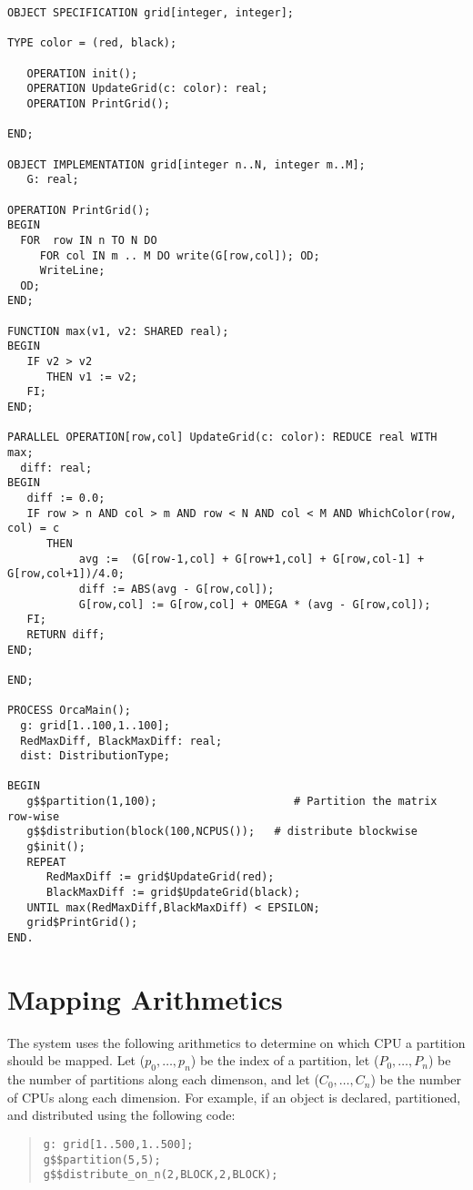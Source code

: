 \documentclass{article}
\begin{document}
\begin{verbatim}
OBJECT SPECIFICATION grid[integer, integer];

TYPE color = (red, black);

   OPERATION init(); 
   OPERATION UpdateGrid(c: color): real; 
   OPERATION PrintGrid();

END; 

OBJECT IMPLEMENTATION grid[integer n..N, integer m..M]; 
   G: real; 

OPERATION PrintGrid(); 
BEGIN 
  FOR  row IN n TO N DO 
     FOR col IN m .. M DO write(G[row,col]); OD; 
     WriteLine;
  OD; 
END; 

FUNCTION max(v1, v2: SHARED real);
BEGIN
   IF v2 > v2
      THEN v1 := v2;
   FI;
END;

PARALLEL OPERATION[row,col] UpdateGrid(c: color): REDUCE real WITH max; 
  diff: real; 
BEGIN
   diff := 0.0; 
   IF row > n AND col > m AND row < N AND col < M AND WhichColor(row, col) = c 
      THEN
           avg :=  (G[row-1,col] + G[row+1,col] + G[row,col-1] + G[row,col+1])/4.0; 
           diff := ABS(avg - G[row,col]); 
           G[row,col] := G[row,col] + OMEGA * (avg - G[row,col]);
   FI;
   RETURN diff;
END; 

END; 

PROCESS OrcaMain();
  g: grid[1..100,1..100]; 
  RedMaxDiff, BlackMaxDiff: real; 
  dist: DistributionType;

BEGIN 
   g$$partition(1,100);                     # Partition the matrix row-wise
   g$$distribution(block(100,NCPUS());   # distribute blockwise
   g$init(); 
   REPEAT 
      RedMaxDiff := grid$UpdateGrid(red); 
      BlackMaxDiff := grid$UpdateGrid(black); 
   UNTIL max(RedMaxDiff,BlackMaxDiff) < EPSILON;
   grid$PrintGrid();
END. 
\end{verbatim} 

\newpage
\section{Mapping Arithmetics}
\label{app:arithmetics}

The system uses the following arithmetics to determine on which CPU a
partition should be mapped. Let ($p_0,\ldots,p_n$) be the index of a
partition, let ($P_0,\ldots,P_n$) be the number of partitions along
each dimenson, and let ($C_0,\ldots,C_n$) be the number of CPUs along
each dimension. For example, if an object is declared, partitioned,
and distributed using the following code:

\begin{quote}
\begin{verbatim}
g: grid[1..500,1..500];
g$$partition(5,5);
g$$distribute_on_n(2,BLOCK,2,BLOCK);
\end{verbatim}
\end{quote}
\end{document}
